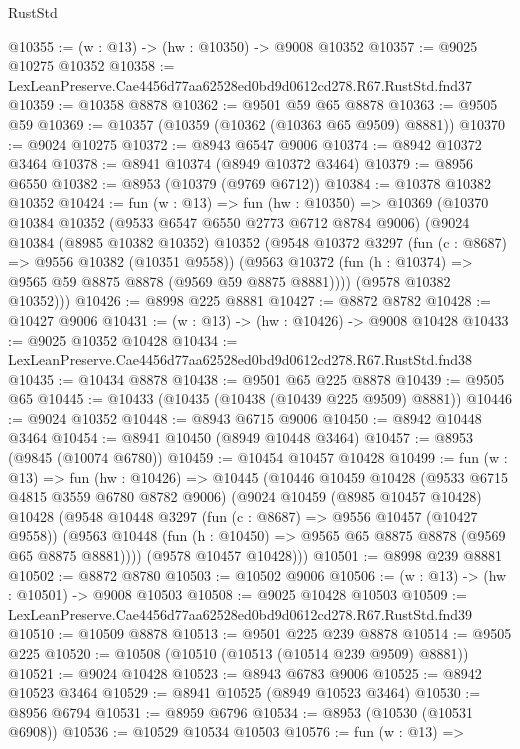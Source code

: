 \begin{lexlean}{RustStd}
\begin{coremodule}
@10355 := (w : @13) -> (hw : @10350) -> @9008 @10352
@10357 := @9025 @10275 @10352
@10358 := LexLeanPreserve.Cae4456d77aa62528ed0bd9d0612cd278.R67.RustStd.fnd37
@10359 := @10358 @8878
@10362 := @9501 @59 @65 @8878
@10363 := @9505 @59
@10369 := @10357 (@10359 (@10362 (@10363 @65 @9509) @8881))
@10370 := @9024 @10275
@10372 := @8943 @6547 @9006
@10374 := @8942 @10372 @3464
@10378 := @8941 @10374 (@8949 @10372 @3464)
@10379 := @8956 @6550
@10382 := @8953 (@10379 (@9769 @6712))
@10384 := @10378 @10382 @10352
@10424 := fun (w : @13) =>
  fun (hw : @10350) =>
  @10369
    (@10370
      @10384
      @10352
      (@9533 @6547 @6550 @2773 @6712 @8784 @9006)
      (@9024
        @10384
        (@8985 @10382 @10352)
        @10352
        (@9548
          @10372
          @3297
          (fun (c : @8687) => @9556 @10382 (@10351 @9558))
          (@9563 @10372 (fun (h : @10374) => @9565 @59 @8875 @8878 (@9569 @59 @8875 @8881))))
        (@9578 @10382 @10352)))
@10426 := @8998 @225 @8881
@10427 := @8872 @8782
@10428 := @10427 @9006
@10431 := (w : @13) -> (hw : @10426) -> @9008 @10428
@10433 := @9025 @10352 @10428
@10434 := LexLeanPreserve.Cae4456d77aa62528ed0bd9d0612cd278.R67.RustStd.fnd38
@10435 := @10434 @8878
@10438 := @9501 @65 @225 @8878
@10439 := @9505 @65
@10445 := @10433 (@10435 (@10438 (@10439 @225 @9509) @8881))
@10446 := @9024 @10352
@10448 := @8943 @6715 @9006
@10450 := @8942 @10448 @3464
@10454 := @8941 @10450 (@8949 @10448 @3464)
@10457 := @8953 (@9845 (@10074 @6780))
@10459 := @10454 @10457 @10428
@10499 := fun (w : @13) =>
  fun (hw : @10426) =>
  @10445
    (@10446
      @10459
      @10428
      (@9533 @6715 @4815 @3559 @6780 @8782 @9006)
      (@9024
        @10459
        (@8985 @10457 @10428)
        @10428
        (@9548
          @10448
          @3297
          (fun (c : @8687) => @9556 @10457 (@10427 @9558))
          (@9563 @10448 (fun (h : @10450) => @9565 @65 @8875 @8878 (@9569 @65 @8875 @8881))))
        (@9578 @10457 @10428)))
@10501 := @8998 @239 @8881
@10502 := @8872 @8780
@10503 := @10502 @9006
@10506 := (w : @13) -> (hw : @10501) -> @9008 @10503
@10508 := @9025 @10428 @10503
@10509 := LexLeanPreserve.Cae4456d77aa62528ed0bd9d0612cd278.R67.RustStd.fnd39
@10510 := @10509 @8878
@10513 := @9501 @225 @239 @8878
@10514 := @9505 @225
@10520 := @10508 (@10510 (@10513 (@10514 @239 @9509) @8881))
@10521 := @9024 @10428
@10523 := @8943 @6783 @9006
@10525 := @8942 @10523 @3464
@10529 := @8941 @10525 (@8949 @10523 @3464)
@10530 := @8956 @6794
@10531 := @8959 @6796
@10534 := @8953 (@10530 (@10531 @6908))
@10536 := @10529 @10534 @10503
@10576 := fun (w : @13) =>

\end{coremodule}
\end{lexlean}
